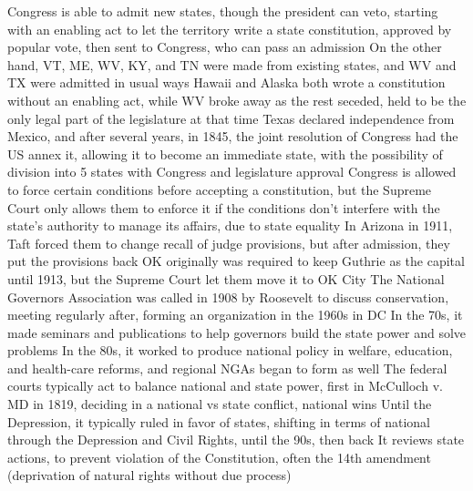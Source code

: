 \documentclass[11 pt, twoside]{article}
\newenvironment{outline*}
{
	\begin{outline}[enumerate]
	}
	{\end{outline}
}
\begin{document}
\begin{outline*}
\1 Congress is able to admit new states, though the president can veto, starting with an enabling act to let the territory write a state constitution, approved by popular vote, then sent to Congress, who can pass an admission
\2 On the other hand, VT, ME, WV, KY, and TN were made from existing states, and WV and TX were admitted in usual ways
\2 Hawaii and Alaska both wrote a constitution without an enabling act, while WV broke away as the rest seceded, held to be the only legal part of the legislature at that time
\2 Texas declared independence from Mexico, and after several years, in 1845, the joint resolution of Congress had the US annex it, allowing it to become an immediate state, with the possibility of division into 5 states with Congress and legislature approval
\1 Congress is allowed to force certain conditions before accepting a constitution, but the Supreme Court only allows them to enforce it if the conditions don’t interfere with the state’s authority to manage its affairs, due to state equality
\2 In Arizona in 1911, Taft forced them to change recall of judge provisions, but after admission, they put the provisions back
\2 OK originally was required to keep Guthrie as the capital until 1913, but the Supreme Court let them move it to OK City
\1 The National Governors Association was called in 1908 by Roosevelt to discuss conservation, meeting regularly after, forming an organization in the 1960s in DC
\2 In the 70s, it made seminars and publications to help governors build the state power and solve problems
\2 In the 80s, it worked to produce national policy in welfare, education, and health-care reforms, and regional NGAs began to form as well
\1 The federal courts typically act to balance national and state power, first in McCulloch v. MD in 1819, deciding in a national vs state conflict, national wins
\2 Until the Depression, it typically ruled in favor of states, shifting in terms of national through the Depression and Civil Rights, until the 90s, then back
\2 It reviews state actions, to prevent violation of the Constitution, often the 14th amendment (deprivation of natural rights without due process)
\end{outline*}
\end{document}
